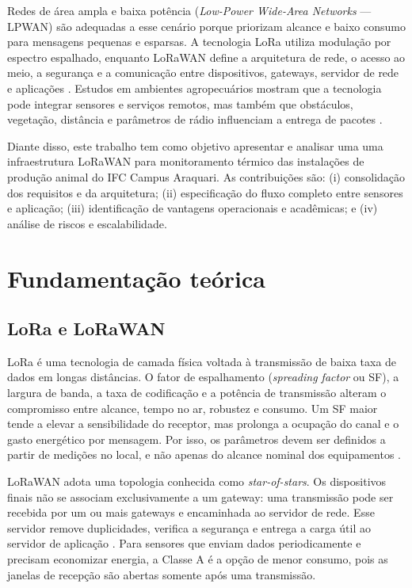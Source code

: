 \documentclass[10pt,a4paper,twocolumn]{article}
\begin{document}
Redes de área ampla e baixa potência (\textit{Low-Power Wide-Area Networks} ---
LPWAN) são adequadas a esse cenário porque priorizam alcance e baixo consumo para
mensagens pequenas e esparsas. A tecnologia LoRa utiliza modulação por espectro
espalhado, enquanto LoRaWAN define a arquitetura de rede, o acesso ao meio, a
segurança e a comunicação entre dispositivos, gateways, servidor de rede e
aplicações \cite{macedo2023}. Estudos em ambientes agropecuários mostram que a
tecnologia pode integrar sensores e serviços remotos, mas também que obstáculos,
vegetação, distância e parâmetros de rádio influenciam a entrega de pacotes
\cite{fu2022,ting2024,ahmed2025}.

Diante disso, este trabalho tem como objetivo apresentar e analisar uma
uma infraestrutura LoRaWAN para monitoramento térmico das instalações de produção
animal do IFC Campus Araquari. As contribuições são: (i) consolidação dos
requisitos e da arquitetura; (ii) especificação do fluxo completo entre sensores
e aplicação; (iii) identificação de vantagens operacionais e acadêmicas; e (iv)
análise de riscos e escalabilidade.

\section{Fundamentação teórica}

\subsection{LoRa e LoRaWAN}

LoRa é uma tecnologia de camada física voltada à transmissão de baixa taxa de
dados em longas distâncias. O fator de espalhamento (\textit{spreading factor} ou
SF), a largura de banda, a taxa de codificação e a potência de transmissão
alteram o compromisso entre alcance, tempo no ar, robustez e consumo. Um SF maior
tende a elevar a sensibilidade do receptor, mas prolonga a ocupação do canal e o
gasto energético por mensagem. Por isso, os parâmetros devem ser definidos a
partir de medições no local, e não apenas do alcance nominal dos equipamentos
\cite{macedo2023,krizanovic2023}.

LoRaWAN adota uma topologia conhecida como \textit{star-of-stars}. Os
dispositivos finais não se associam exclusivamente a um gateway: uma transmissão
pode ser recebida por um ou mais gateways e encaminhada ao servidor de rede. Esse
servidor remove duplicidades, verifica a segurança e entrega a carga útil ao
servidor de aplicação \cite{macedo2023}. Para sensores que enviam dados
periodicamente e precisam economizar energia, a Classe A é a opção de menor
consumo, pois as janelas de recepção são abertas somente após uma transmissão.
\end{document}

